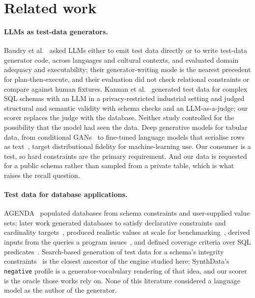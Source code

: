 \documentclass[preprint,12pt]{elsarticle}
\begin{document}
\section{Related work}
\label{sec:related}

\paragraph{LLMs as test-data generators.} Baudry et al.~\cite{baudry2024generators} asked LLMs either to emit test data directly or to write test-data generator code, across languages and cultural contexts, and evaluated domain adequacy and executability; their generator-writing mode is the nearest precedent for plan-then-execute, and their evaluation did not check relational constraints or compare against human fixtures. Kannan et al.~\cite{kannan2025sqltestdata} generated test data for complex SQL schemas with an LLM in a privacy-restricted industrial setting and judged structural and semantic validity with schema checks and an LLM-as-a-judge; our scorer replaces the judge with the database. Neither study controlled for the possibility that the model had seen the data. Deep generative models for tabular data, from conditional GANs~\cite{xu2019ctgan} to fine-tuned language models that serialise rows as text~\cite{borisov2023great}, target distributional fidelity for machine-learning use. Our consumer is a test, so hard constraints are the primary requirement. And our data is requested for a public schema rather than sampled from a private table, which is what raises the recall question.

\paragraph{Test data for database applications.} AGENDA~\cite{chays2004agenda} populated databases from schema constraints and user-supplied value sets; later work generated databases to satisfy declarative constraints and cardinality targets~\cite{arasu2011declarative}, produced realistic values at scale for benchmarking~\cite{bruno2005flexible,houkjaer2006simple}, derived inputs from the queries a program issues~\cite{emmi2007dynamic}, and defined coverage criteria over SQL predicates~\cite{tuya2010full}. Search-based generation of test data for a schema's integrity constraints~\cite{kapfhammer2013search,mcminn2015effectiveness} is the closest ancestor of the engine studied here; SynthData's \texttt{negative} profile is a generator-vocabulary rendering of that idea, and our scorer is the oracle those works rely on. None of this literature considered a language model as the author of the generator.
\end{document}

